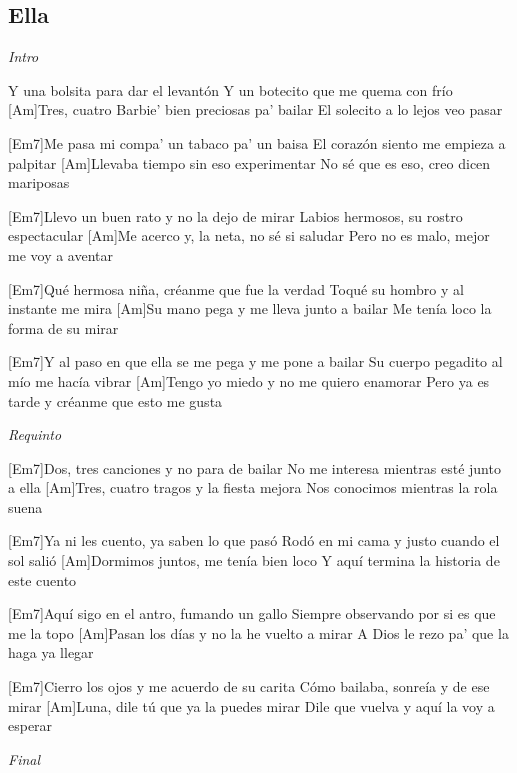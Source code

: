 \subsection{Ella}

\noindent
\vspace{1cm}

\begin{guitar}
	\begin{multicols}{2}

		\textit{Intro}
		\par
		[Em7]Y una bolsita para dar el levantón
		Y un botecito que me quema con frío
		[Am]Tres, cuatro Barbie' bien preciosas pa' bailar
		El solecito a lo lejos veo pasar

		[Em7]Me pasa mi compa' un tabaco pa' un baisa
		El corazón siento me empieza a palpitar
		[Am]Llevaba tiempo sin eso experimentar
		No sé que es eso, creo dicen mariposas

		[Em7]Llevo un buen rato y no la dejo de mirar
		Labios hermosos, su rostro espectacular
		[Am]Me acerco y, la neta, no sé si saludar
		Pero no es malo, mejor me voy a aventar

		[Em7]Qué hermosa niña, créanme que fue la verdad
		Toqué su hombro y al instante me mira
		[Am]Su mano pega y me lleva junto a bailar
		Me tenía loco la forma de su mirar

		[Em7]Y al paso en que ella se me pega y me pone a bailar
		Su cuerpo pegadito al mío me hacía vibrar
		[Am]Tengo yo miedo y no me quiero enamorar
		Pero ya es tarde y créanme que esto me gusta

		\par
		\textit{Requinto}
		\par

		[Em7]Dos, tres canciones y no para de bailar
		No me interesa mientras esté junto a ella
		[Am]Tres, cuatro tragos y la fiesta mejora
		Nos conocimos mientras la rola suena

		[Em7]Ya ni les cuento, ya saben lo que pasó
		Rodó en mi cama y justo cuando el sol salió
		[Am]Dormimos juntos, me tenía bien loco
		Y aquí termina la historia de este cuento

		[Em7]Aquí sigo en el antro, fumando un gallo
		Siempre observando por si es que me la topo
		[Am]Pasan los días y no la he vuelto a mirar
		A Dios le rezo pa' que la haga ya llegar
	
		[Em7]Cierro los ojos y me acuerdo de su carita
		Cómo bailaba, sonreía y de ese mirar
		[Am]Luna, dile tú que ya la puedes mirar
		Dile que vuelva y aquí la voy a esperar

		\par
		\textit{Final}
	\end{multicols}
\end{guitar}
